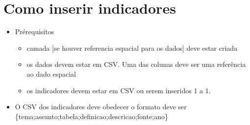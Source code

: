 \documentclass[letterpaper,10pt,brazil]{sphinxmanual}
\begin{document}
\section{Como inserir indicadores}
\label{\detokenize{exemplos/criando_indicadores:Como-inserir-indicadores}}\label{\detokenize{exemplos/criando_indicadores::doc}}\begin{itemize}
\item {} 
\sphinxAtStartPar
Pré\sphinxhyphen{}requisitos
\begin{itemize}
\item {} 
\sphinxAtStartPar
camada {[}se houver referencia espacial para os dados{]} deve estar criada

\item {} 
\sphinxAtStartPar
os dados devem estar em CSV. Uma das colunas deve ser uma referência ao dado espacial

\item {} 
\sphinxAtStartPar
os indicadores devem estar em CSV ou serem inseridos 1 a 1.

\end{itemize}

\item {} 
\sphinxAtStartPar
O CSV dos indicadores deve obedecer o formato deve ser \{tema;assunto;tabela;definicao;descricao;fonte;ano\}

\end{itemize}
\end{document}
